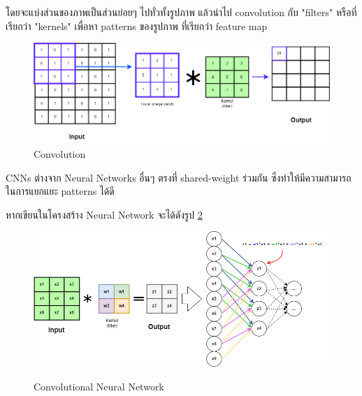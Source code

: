 โดยจะแบ่งส่วนของภาพเป็นส่วนย่อยๆ ไปทั่วทั้งรูปภาพ แล้วนำไป convolution กับ  "filters" หรือที่เรียกว่า "kernels" เพื่อหา patterns ของรูปภาพ ที่เรียกว่า feature map
\begin{figure}[h]
  \begin{center}

    \includegraphics[scale=0.35]{pic/model/cnn_1.png}
  \end{center}
  \caption[Convolution]{Convolution}
  \label{fig:Convolution }
\end{figure}


CNNs ต่างจาก Neural Networks อื่นๆ ตรงที่  shared-weight ร่วมกัน ซึ่งทำให้มีความสามารถในการแยกแยะ patterns ได้ดี


หากเขียนในโครงสร้าง Neural Network จะได้ดังรูป \ref{fig:Convolutional Neural Network}
\begin{figure}[h]
  \begin{center}

    \includegraphics[scale=0.35]{pic/model/cnn_nn_1.png}\cite{CNN_mlp}
  \end{center}

  \caption[Convolutional Neural Network]{Convolutional Neural Network}
  \label{fig:Convolutional Neural Network}
\end{figure}



